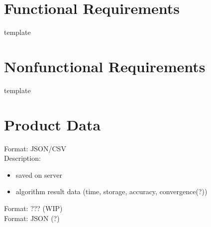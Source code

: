 \section{Functional Requirements}


template


\section{Nonfunctional Requirements}


template


\section{Product Data}

Format: JSON/CSV \\
Description: 
\begin{itemize}
	\item saved on server
	\item algorithm result data (time, storage, accuracy, convergence(?))
\end{itemize}

Format: ??? (WIP) \\

Format: JSON (?)
